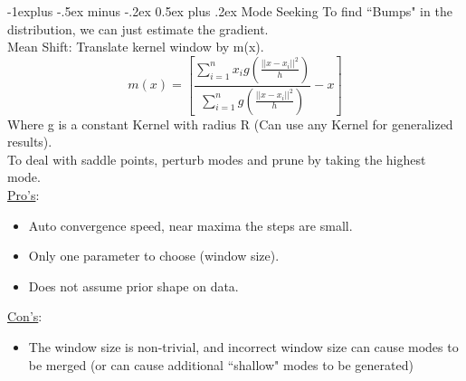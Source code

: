 \documentclass[3pt,landscape]{article}
\makeatletter
\renewcommand{\subsection}{\@startsection{subsection}{2}{0mm}%
                            {-1explus -.5ex minus -.2ex}%
                            {0.5ex plus .2ex}%
                            {\normalfont\normalsize\bfseries}}
\makeatother
\begin{document}
\begin{multicols}{3}
\subsection{Mode Seeking}
To find ``Bumps" in the distribution, we can just estimate the gradient.\\
Mean Shift: Translate kernel window by m(x).\\
\[m(x)=\left[ \frac{\sum_{i=1}^n x_i g(\frac{||x-x_i||^2}{h})}{\sum_{i=1}^n g(\frac{||x-x_i||^2}{h})} - x \right] \]
Where g is a constant Kernel with radius R (Can use any Kernel for generalized results).\\
To deal with saddle points, perturb modes and prune by taking the highest mode.\\
\underline{Pro's}:
\begin{itemize}[topsep=0pt, partopsep=0pt]
    \setlength{\itemsep}{1pt}
    \setlength{\parskip}{0pt}
    \setlength{\parsep}{0pt}
    \item Auto convergence speed, near maxima the steps are small.
    \item Only one parameter to choose (window size).
    \item Does not assume prior shape on data.
\end{itemize}
\underline{Con's}:
\begin{itemize}[topsep=0pt, partopsep=0pt]
    \setlength{\itemsep}{1pt}
    \setlength{\parskip}{0pt}
    \setlength{\parsep}{0pt}
    \item The window size is non-trivial, and incorrect window size can cause modes to be merged (or can cause additional ``shallow" modes to be generated)
\end{itemize}

\vfill
\columnbreak

\end{multicols}
\end{document}
